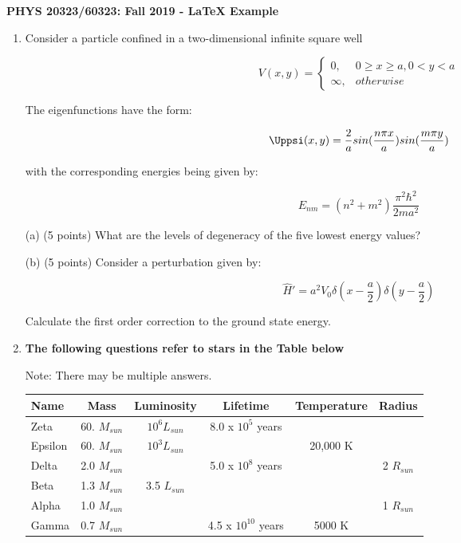\documentclass{article}
\title{}
\begin{document}
\begin{center}
{\bf PHYS 20323/60323: Fall 2019 - LaTeX Example}
\end{center}

\begin{enumerate}

\item{ Consider a particle confined in a two-dimensional infinite square well

\[V(x,y) = \left\{
  \begin{array}{lc}
    0, & 0 \ge x \ge a, 0 < y < a\\
    {\infty}, & {otherwise}
  \end{array}
\right.
\]

The eigenfunctions have the form:

\begin{equation} 
 \Uppsi(x,y)=\frac{2}{a}sin(\frac{n{\pi}x}{a})sin(\frac{m{\pi}y}{a})
\end{equation}

with the corresponding energies being given by:

\begin{equation} 
 E_{nm}=(n^2+m^2)\frac{{\pi^2}{\hbar^2}}{2ma^2}
\end{equation}

(a) (5 points) What are the levels of degeneracy of the five lowest energy values?

\vspace{3mm}

(b) (5 points) Consider a perturbation given by:

\begin{equation} 
 \hat{H}' = a^2V_0 {\delta}(x-\frac{a}{2}) \delta(y-\frac{a}{2})
\end{equation}

Calculate the first order correction to the ground state energy.}

\vspace{7mm}

\item {{\bf The following questions refer to stars in the Table below}

Note: There may be multiple answers. 

\begin{center}
\begin{tabular}{ | l | c | c | c | c | c |}
 \hline
 Name & Mass & Luminosity &  Lifetime & Temperature & Radius\\ 
 \hline
 Zeta & 60. $M_{sun}$ & $10^6 L_{sun}$ & 8.0 x $10^5$ years & &\\  
 \hline
  Epsilon & 60. $M_{sun}$ & $10^3 L_{sun}$ & & 20,000 K &\\  
 \hline
  Delta & 2.0 $M_{sun}$ & & 5.0 x $10^8$ years & & 2 $R_{sun}$\\  
 \hline
  Beta & 1.3 $M_{sun}$ & 3.5 $L_{sun}$ & & &\\  
 \hline
  Alpha & 1.0 $M_{sun}$ & & & & 1 $R_{sun}$\\  
 \hline
  Gamma & 0.7 $M_{sun}$ & & 4.5 x $10^{10}$ years & 5000 K &\\  
 \hline
\end{tabular}
\end{center}

}
\end{enumerate}
\end{document}
